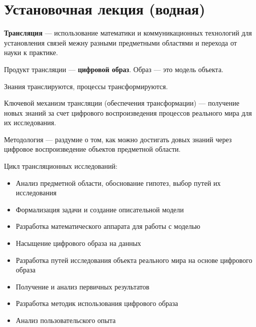 





\section{Установочная лекция (водная)}

\textbf{Трансляция} --- использование математики и коммуникационных технологий
для установления связей межну разными предметными областями и перехода от науки
к практике.

Продукт трансляции --- \textbf{цифровой образ}. Образ --- это модель объекта.

Знания транслируются, процессы трансформируются.

Ключевой механизм трансляции (обеспечения трансформации) --- получение новых
знаний за счет цифрового воспроизведения процессов реального мира для их
исследования.

Методология --- раздумие о том, как можно достигать довых знаний через цифровое
воспроизведение объектов предметной области.

Цикл трансляционных исследований:
\begin{itemize}
    \item Анализ предметной области, обоснование гипотез, выбор путей их
        исследования

    \item Формализация задачи и создание описательной модели

    \item Разработка математического аппарата для работы с моделью

    \item Насыщение цифрового образа на данных

    \item Разработка путей исследования объекта реального мира на основе
        цифрового образа

    \item Получение и анализ первичных результатов

    \item Разработка методик использования цифрового образа

    \item Анализ пользовательского опыта
\end{itemize}

